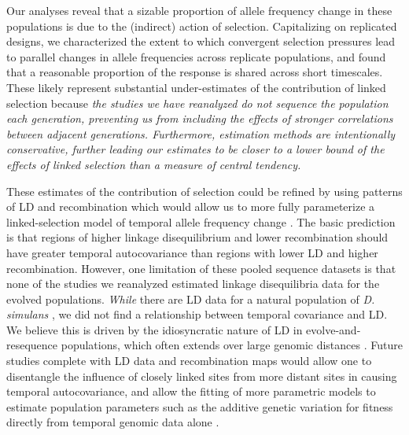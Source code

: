 \documentclass[11pt]{article}
\newcommand{\vb}[1]{{\it \color{blue} #1}}
\begin{document}
Our analyses reveal that a sizable proportion of allele frequency change in
these populations is due to the (indirect) action of selection. Capitalizing on
replicated designs, we characterized the extent to which convergent selection
pressures lead to parallel changes in allele frequencies across replicate
populations, and found that a reasonable proportion of the response is shared
across short timescales. These likely represent substantial under-estimates of
the contribution of linked selection because \vb{the studies we have reanalyzed
do not sequence the population each generation, preventing us from including
the effects of stronger correlations between adjacent generations.
Furthermore, estimation methods are intentionally conservative, further
leading our estimates to be closer to a lower bound of the effects of linked
selection than a measure of central tendency.}

These estimates of the contribution of selection could be refined by using
patterns of LD and recombination which would allow us to more fully
parameterize a linked-selection model of temporal allele frequency change
\parencite{Buffalo2019-io}. The basic prediction is that regions of higher
linkage disequilibrium and lower recombination should have greater temporal
autocovariance than regions with lower LD and higher recombination. However,
one limitation of these pooled sequence datasets is that none of the studies we
reanalyzed estimated linkage disequilibria data for the evolved populations.
\vb{While} there are LD data for a natural population of \emph{D. simulans}
\parencite{Signor2018-wg},  we did not find a relationship between temporal
covariance and LD.  We believe this is driven by the idiosyncratic nature of LD
in evolve-and-resequence populations, which often extends over large genomic
distances \parencite{Nuzhdin2013-gf,Kelly2019-dc}. Future studies complete with
LD data and recombination maps would allow one to disentangle the influence of
closely linked sites from more distant sites in causing temporal
autocovariance, and allow the fitting of more parametric models to estimate
population parameters such as the additive genetic variation for fitness
directly from temporal genomic data alone \parencite{Buffalo2019-io}.
\end{document}
